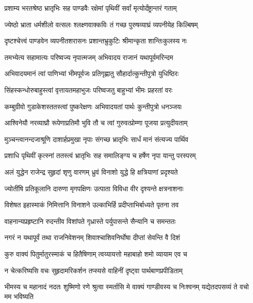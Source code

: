 \twolineshloka
{प्रशाम्य भरतश्रेष्ठ भ्रातृभिः सह पाण्डवैः}
{रक्षेमां पृथिवीं सर्वां मृत्योर्दंष्ट्रान्तरं गताम्}


\twolineshloka
{ज्येष्ठो भ्राता धर्मशीलो वत्सलः श्लक्ष्णवाक्कविः}
{तं गच्छ पुरुषव्याघ्रं व्यपनीयेह किल्बिषम्}


\twolineshloka
{दृष्टश्चेत्त्वं पाण्डवेन व्यपनीतशरासनः}
{प्रशान्तभ्रुकुटिः श्रीमान्कृता शान्तिःकुलस्य नः}


\twolineshloka
{तमभ्येत्य सहामात्यः परिष्वज्य नृपात्मजम्}
{अभिवादय राजानं यथापूर्वमरिन्दम}


\twolineshloka
{अभिवादयमानं त्वां पाणिभ्यां भीमपूर्वजः}
{प्रतिगृह्णातु सौहार्दात्कुन्तीपुत्रो युधिष्ठिरः}


\twolineshloka
{सिंहस्कन्धोरुबाहुस्त्वां वृत्तायतमहाभुजः}
{परिष्वजतु बाहुभ्यां भीमः प्रहरतां वरः}


\twolineshloka
{कम्बुग्रीवो गुडाकेशस्ततस्त्वां पुष्करेक्षणः}
{अभिवादयतां पार्थः कुन्तीपुत्रो धनञ्जयः}


\twolineshloka
{आश्विनेयौ नरव्याघ्रौ रूपेणाप्रतिमौ भुवि}
{तौ च त्वां गुरुवत्प्रोम्णा पूजया प्रत्युदीयताम्}


\twolineshloka
{मुञ्चन्त्वानन्दजाश्रूणि दाशार्हप्रमुखा नृपाः}
{संगच्छ भ्रातृभिः सार्धं मानं संत्यज्य पार्थिव}


\twolineshloka
{प्रशाधि पृथिवीं कृत्स्नां ततस्त्वं भ्रातृभिः सह}
{समालिङ्ग्य च हर्षेण नृपा यान्तु परस्परम्}


\twolineshloka
{अलं युद्धेन राजेन्द्र सुहृदां शृणु वारणम्}
{ध्रुवं विनाशो युद्धे हि क्षत्रियाणां प्रदृश्यते}


\twolineshloka
{ज्योतींषि प्रतिकूलानि दारुणा मृगपक्षिणः}
{उत्पाता विविधा वीर दृश्यन्ते क्षत्रनाशनाः}


\twolineshloka
{विशेषत इहास्माकं निमित्तानि विनाशने}
{उल्काभिर्हि प्रदीप्ताभिर्बाध्यते पृतना तव}


\twolineshloka
{वाहनान्यप्रहृष्टानि रुदन्तीव विशांपते}
{गृध्रास्ते पर्युपासन्ते सैन्यानि च समन्ततः}


\twolineshloka
{नगरं न यथापूर्वं तथा राजनिवेशनम्}
{शिवाश्चाशिवनिर्घोषा दीप्तां सेवन्ति वै दिशं}


\twolineshloka
{कुरु वाक्यं पितुर्मातुरस्माकं च हितैषिणाम्}
{त्वय्यायत्तो महाबाहो शमो व्यायाम एव च}


\twolineshloka
{न चेत्करिष्यसि वचः सुहृदामरिकर्शन}
{तप्स्यसे वाहिनीं दृष्ट्वा पार्थबाणप्रपीडिताम्}


\threelineshloka
{भीमस्य च महानादं नदतः शुष्मिणो रणे}
{श्रुत्वा स्मर्तासि मे वाक्यं गाण्डीवस्य च निःश्वनम्}
{यद्येतदपसव्यं ते वचो मम भविष्यति}


